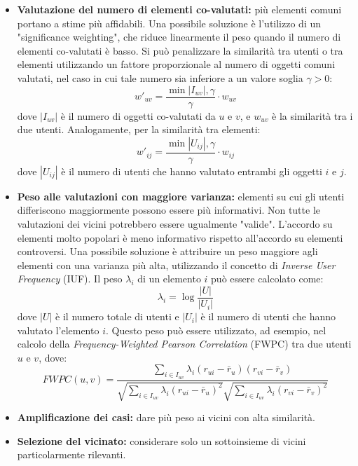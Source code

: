 \documentclass{report}
\begin{document}
	\begin{itemize}
		\item \textbf{Valutazione del numero di elementi co-valutati:} più elementi comuni portano a stime più affidabili. 
		Una possibile soluzione è l'utilizzo di un "significance weighting", che riduce linearmente il peso quando il numero di elementi co-valutati è basso. Si può penalizzare la similarità tra utenti o tra elementi utilizzando un fattore proporzionale al numero di oggetti comuni valutati, nel caso in cui tale numero sia inferiore a un valore soglia $\gamma > 0$:
		\[
		w'_{uv} = \frac{\min{|I_{uv}|, \gamma}}{\gamma} \cdot w_{uv}
		\]
		dove $|I_{uv}|$ è il numero di oggetti co-valutati da $u$ e $v$, e $w_{uv}$ è la similarità tra i due utenti. Analogamente, per la similarità tra elementi:
		\[
		w'_{ij} = \frac{\min{|U_{ij}|, \gamma}}{\gamma} \cdot w_{ij}
		\]
		dove $|U_{ij}|$ è il numero di utenti che hanno valutato entrambi gli oggetti $i$ e $j$.
	
		\item \textbf{Peso alle valutazioni con maggiore varianza:} elementi su cui gli utenti differiscono maggiormente possono essere più informativi. Non tutte le valutazioni dei vicini potrebbero essere ugualmente "valide". L'accordo su elementi molto popolari è meno informativo rispetto all'accordo su elementi controversi. Una possibile soluzione è attribuire un peso maggiore agli elementi con una varianza più alta, utilizzando il concetto di \textit{Inverse User Frequency} (IUF). 
		Il peso $\lambda_i$ di un elemento $i$ può essere calcolato come:
		\[
		\lambda_i = \log \frac{|U|}{|U_i|}
		\]
		dove $|U|$ è il numero totale di utenti e $|U_i|$ è il numero di utenti che hanno valutato l'elemento $i$. Questo peso può essere utilizzato, ad esempio, nel calcolo della \textit{Frequency-Weighted Pearson Correlation} (FWPC) tra due utenti $u$ e $v$, dove:
		\[
		FWPC(u, v) = \frac{\sum_{i \in I_{uv}} \lambda_i (r_{ui} - \bar{r}_u)(r_{vi} - \bar{r}_v)}{\sqrt{\sum_{i \in I_{uv}} \lambda_i (r_{ui} - \bar{r}_u)^2} \sqrt{\sum_{i \in I_{uv}} \lambda_i (r_{vi} - \bar{r}_v)^2}}
		\]
	
		\item \textbf{Amplificazione dei casi:} dare più peso ai vicini con alta similarità.
		\item \textbf{Selezione del vicinato:} considerare solo un sottoinsieme di vicini particolarmente rilevanti.
	\end{itemize}
\end{document}
